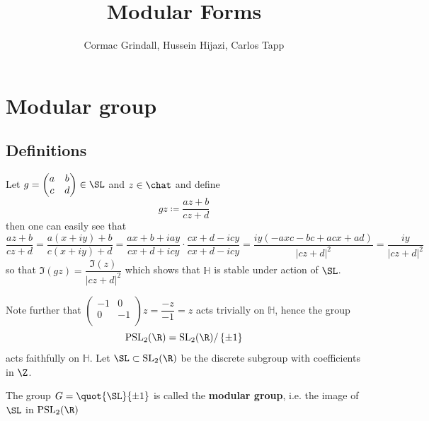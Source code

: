 \documentclass[12pt]{article}
\theoremstyle{definition}
\begin{document}
\title{\textbf {Modular Forms}}
\author{Cormac Grindall, Hussein Hijazi, Carlos Tapp}
	\date{}
	\maketitle
    \section{Modular group}
    \subsection{Definitions}
    Let \(g = \begin{pmatrix}
        a &  b \\
        c &  d  \\
    \end{pmatrix} \in \SL\) and $z\in \chat$ and define \[gz \coloneqq  \dfrac{az+b}{cz+d}\] then one can easily see that 
    \[
        \frac{az+b}{cz+d}=\frac{a(x+iy)+b}{c(x+iy)+d}=\frac{ax+b+iay}{cx+d+icy}\cdot\frac{cx+d-icy}{cx+d-icy} = \frac{iy(-axc-bc+acx+ad)}{\vert cz+d \vert^{2} } = \frac{iy}{\vert cz+d \vert^{2} }
    \]
    so that $\Im(gz) = \dfrac{\Im(z)}{\vert cz+d \vert^{2}  }$ which shows that \(\mathbb{H} \) is stable under action of \(\SL\). 
    
    Note further that \(\begin{pmatrix}
        -1 &  0 \\
        0 &  -1 \\
    \end{pmatrix}z = \dfrac{-z}{-1}=z\) acts trivially on \(\mathbb{H} \), hence the group \[\mathrm{PSL}_2(\R) = \mathrm{SL}_2(\R)/\left\{\pm 1\right\}  \] acts faithfully on \(\mathbb{H} \). 
    Let \(\SL\subset \mathrm{SL}_2(\R)\) be the discrete subgroup with coefficients in \(\Z\).
    \begin{dfn}
    The group \(G = \quot{\SL}{\pm 1}\) is called the \textbf{modular group}, i.e. the image of \(\SL\) in  \( \mathrm{PSL}_2(\R) \) 
    \end{dfn}
\end{document}
